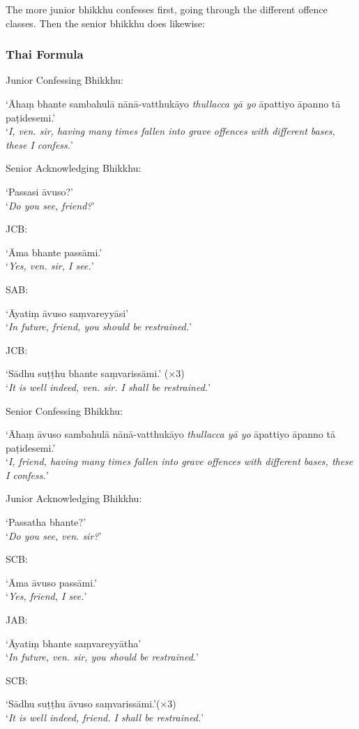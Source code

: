 The more junior bhikkhu confesses first, going through the different offence
classes. Then the senior bhikkhu does likewise:

\subsubsection{Thai Formula}

Junior Confessing Bhikkhu:

‘Āhaṃ bhante sambahulā nānā-vatthukāyo \emph{thullacca yā yo} āpattiyo āpanno tā paṭidesemi.’\\
‘\emph{I, ven. sir, having many times fallen into grave offences with different bases, these I confess.}’

Senior Acknowledging Bhikkhu:

‘Passasi āvuso?’\\
‘\emph{Do you see, friend?}’

JCB:

‘Āma bhante passāmi.’\\
‘\emph{Yes, ven. sir, I see.}’

SAB:

‘Āyatiṃ āvuso saṃvareyyāsi’\\
‘\emph{In future, friend, you should be restrained.}’

JCB:

‘Sādhu suṭṭhu bhante saṃvarissāmi.’ (×3)\\
‘\emph{It is well indeed, ven. sir. I shall be restrained.}’

Senior Confessing Bhikkhu:

‘Āhaṃ āvuso sambahulā nānā-vatthukāyo \emph{thullacca yā yo} āpattiyo āpanno tā paṭidesemi.’\\
‘\emph{I, friend, having many times fallen into grave offences with different bases, these I confess.}’

Junior Acknowledging Bhikkhu:

‘Passatha bhante?’\\
‘\emph{Do you see, ven. sir?}’

SCB:

‘Āma āvuso passāmi.’\\
‘\emph{Yes, friend, I see.}’

JAB:

‘Āyatiṃ bhante saṃvareyyātha’\\
‘\emph{In future, ven. sir, you should be restrained.}’

SCB:

‘Sādhu suṭṭhu āvuso saṃvarissāmi.’(×3)\\
‘\emph{It is well indeed, friend. I shall be restrained.}’

